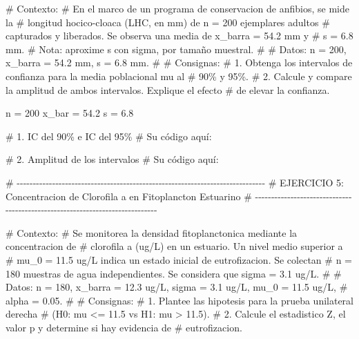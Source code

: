 \documentclass[
  spanish,
  letterpaper,
  DIV=11,
  numbers=noendperiod]{scrreprt}
\newenvironment{Shaded}{\begin{snugshade}}{\end{snugshade}}
\newcommand{\CommentTok}[1]{\textcolor[rgb]{0.37,0.37,0.37}{#1}}
\newcommand{\DecValTok}[1]{\textcolor[rgb]{0.68,0.00,0.00}{#1}}
\newcommand{\FloatTok}[1]{\textcolor[rgb]{0.68,0.00,0.00}{#1}}
\newcommand{\NormalTok}[1]{\textcolor[rgb]{0.00,0.23,0.31}{#1}}
\newcommand{\OtherTok}[1]{\textcolor[rgb]{0.00,0.23,0.31}{#1}}
\begin{document}
\begin{Shaded}
\begin{Highlighting}[]
\CommentTok{\# Contexto:}
\CommentTok{\# En el marco de un programa de conservacion de anfibios, se mide la}
\CommentTok{\# longitud hocico{-}cloaca (LHC, en mm) de n = 200 ejemplares adultos}
\CommentTok{\# capturados y liberados. Se observa una media de x\_barra = 54.2 mm y}
\CommentTok{\# s = 6.8 mm.}
\CommentTok{\# Nota: aproxime s con sigma, por tamaño muestral.}
\CommentTok{\#}
\CommentTok{\# Datos: n = 200, x\_barra = 54.2 mm, s = 6.8 mm.}
\CommentTok{\#}
\CommentTok{\# Consignas:}
\CommentTok{\# 1. Obtenga los intervalos de confianza para la media poblacional mu al}
\CommentTok{\#    90\% y 95\%.}
\CommentTok{\# 2. Calcule y compare la amplitud de ambos intervalos. Explique el efecto}
\CommentTok{\#    de elevar la confianza.}

\NormalTok{n }\OtherTok{=} \DecValTok{200}
\NormalTok{x\_bar }\OtherTok{=} \FloatTok{54.2}
\NormalTok{s }\OtherTok{=} \FloatTok{6.8}

\CommentTok{\# 1. IC del 90\% e IC del 95\%}
\CommentTok{\# Su código aquí:}



\CommentTok{\# 2. Amplitud de los intervalos}
\CommentTok{\# Su código aquí:}



\CommentTok{\# {-}{-}{-}{-}{-}{-}{-}{-}{-}{-}{-}{-}{-}{-}{-}{-}{-}{-}{-}{-}{-}{-}{-}{-}{-}{-}{-}{-}{-}{-}{-}{-}{-}{-}{-}{-}{-}{-}{-}{-}{-}{-}{-}{-}{-}{-}{-}{-}{-}{-}{-}{-}{-}{-}{-}{-}{-}{-}{-}{-}{-}{-}{-}{-}{-}{-}{-}{-}{-}{-}{-}{-}{-}{-}{-}{-}{-}}
\CommentTok{\# EJERCICIO 5: Concentracion de Clorofila a en Fitoplancton Estuarino}
\CommentTok{\# {-}{-}{-}{-}{-}{-}{-}{-}{-}{-}{-}{-}{-}{-}{-}{-}{-}{-}{-}{-}{-}{-}{-}{-}{-}{-}{-}{-}{-}{-}{-}{-}{-}{-}{-}{-}{-}{-}{-}{-}{-}{-}{-}{-}{-}{-}{-}{-}{-}{-}{-}{-}{-}{-}{-}{-}{-}{-}{-}{-}{-}{-}{-}{-}{-}{-}{-}{-}{-}{-}{-}{-}{-}{-}{-}{-}{-}}

\CommentTok{\# Contexto:}
\CommentTok{\# Se monitorea la densidad fitoplanctonica mediante la concentracion de}
\CommentTok{\# clorofila a (ug/L) en un estuario. Un nivel medio superior a}
\CommentTok{\# mu\_0 = 11.5 ug/L indica un estado inicial de eutrofizacion. Se colectan}
\CommentTok{\# n = 180 muestras de agua independientes. Se considera que sigma = 3.1 ug/L.}
\CommentTok{\#}
\CommentTok{\# Datos: n = 180, x\_barra = 12.3 ug/L, sigma = 3.1 ug/L, mu\_0 = 11.5 ug/L,}
\CommentTok{\# alpha = 0.05.}
\CommentTok{\#}
\CommentTok{\# Consignas:}
\CommentTok{\# 1. Plantee las hipotesis para la prueba unilateral derecha}
\CommentTok{\#    (H0: mu \textless{}= 11.5 vs H1: mu \textgreater{} 11.5).}
\CommentTok{\# 2. Calcule el estadistico Z, el valor p y determine si hay evidencia de}
\CommentTok{\#    eutrofizacion.}


\end{Highlighting}
\end{Shaded}
\end{document}
